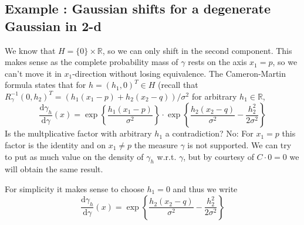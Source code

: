 \documentclass{scrartcl}
\theoremstyle{definition}
\theoremstyle{remark}
\newcommand{\de}{\mathrm d}
\newcommand{\R}{\mathbb R}
\newcommand*\circled[1]{\tikz[baseline=(char.base)]{
            \node[shape=circle,draw,inner sep=2pt] (char) {#1};}}
\DeclareRobustCommand{\myboxtwo}[2][blue!20]{%
\begin{tcolorbox}[   %
        breakable,
        left=0pt,
        right=0pt,
        top=0pt,
        bottom=0pt,
        colback=#1,
        colframe=#1,
        width=\dimexpr\textwidth\relax, 
        enlarge left by=0mm,
        boxsep=5pt,
        arc=10pt,outer arc=10pt,
        ]
        #2
\end{tcolorbox}
}
\begin{document}
\myboxtwo{\subsection*{Example \circled{3}: Gaussian shifts for a degenerate Gaussian in 2-d}
We know that $H = \{0\}\times \R$, so we can only shift in the second component. This makes sense as the complete probability mass of $\gamma$ rests on the axis $x_1=p$, so we can't move it in $x_1$-direction without losing equivalence. The Cameron-Martin formula states that for $h = (h_1,0)^T \in H$ (recall that $R_\gamma^{-1} (0,h_2)^T = (h_1(x_1-p)+h_2(x_2-q))/\sigma^2$ for arbitrary $h_1\in\R$, 
\[ \frac{\de \gamma_h}{\de \gamma}(x) = \exp\left\{\frac{h_1(x_1-p)}{\sigma^2}\right\}\cdot \exp\left\{\frac{h_2(x_2-q)}{\sigma^2} - \frac{h_2^2}{2\sigma^2} \right\} \]
Is the multplicative factor with arbitrary $h_1$ a contradiction? No: For $x_1 = p$ this factor is the identity and on $x_1 \neq p$ the measure $\gamma$ is not supported. We can try to put as much value on the density of $\gamma_h$ w.r.t. $\gamma$, but by courtesy of $C\cdot 0 = 0$ we will obtain the same result.

For simplicity it makes sense to choose $h_1=0$ and thus we write
\[ \frac{\de \gamma_h}{\de \gamma}(x) = \exp\left\{\frac{h_2(x_2-q)}{\sigma^2} - \frac{h_2^2}{2\sigma^2} \right\} \]
}
\end{document}

